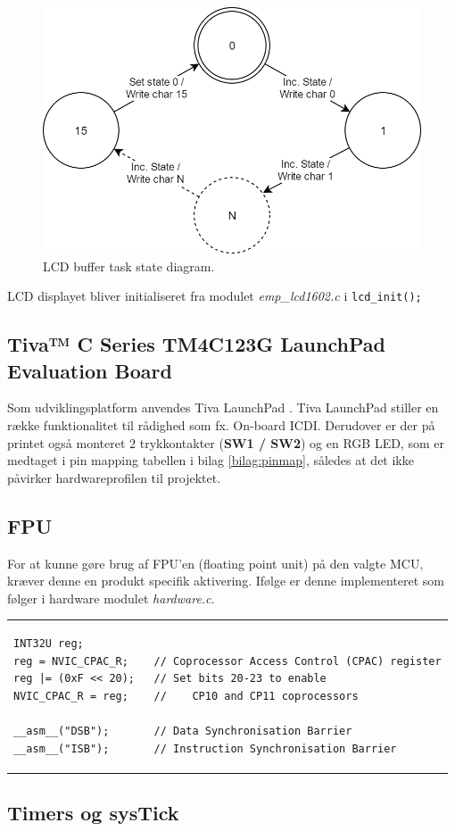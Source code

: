 \begin{figure}[h!]
	\centering
	\includegraphics[width=.6\textwidth]{billeder/lcd_task.png}
	\caption{LCD buffer task state diagram.}
	\label{fig:lcd_task}
\end{figure}


LCD displayet bliver initialiseret fra modulet \textit{emp\_lcd1602.c} i  \texttt{lcd\_init();}
  
\FloatBlock

\subsection{Tiva™ C Series TM4C123G LaunchPad Evaluation Board}
Som udviklingsplatform anvendes Tiva LaunchPad \cite{spmu296}. 
Tiva LaunchPad stiller en række funktionalitet til rådighed som fx. On-board ICDI.
Derudover er der på printet også monteret 2 trykkontakter (\textbf{SW1 / SW2}) og en RGB LED, som er medtaget i pin mapping tabellen i bilag \ref{bilag:pinmap}, således at det ikke påvirker hardwareprofilen til projektet.   

\subsection{FPU}
For at kunne gøre brug af FPU'en (floating point unit) på den valgte MCU, kræver denne en produkt specifik aktivering.
Ifølge \cite[afsnit 3.1.5.7 s. 132]{tm4c123gh6pm} er denne implementeret som følger i hardware modulet \textit{hardware.c}.

\begin{tabular}{l}
\begin{lstlisting}[title=init\_FPU()]
INT32U reg;
reg = NVIC_CPAC_R;    // Coprocessor Access Control (CPAC) register
reg |= (0xF << 20);   // Set bits 20-23 to enable 
NVIC_CPAC_R = reg;    // 	CP10 and CP11 coprocessors

__asm__("DSB");       // Data Synchronisation Barrier
__asm__("ISB");       // Instruction Synchronisation Barrier
\end{lstlisting}
\end{tabular}

\subsection{Timers og sysTick}

 